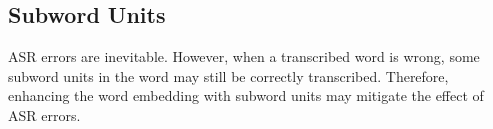 \documentclass[a4paper]{article}
\begin{document}
\begin{comment}
\begin{itemize}
  \item \textbf{BiDirectional Attention Flow (BiDAF)}~\cite{seo2016bidirectional}:   
  In BIDAF, both character-level and word-level embeddings are incorporated, and bi-directional attention flow  is introduced to obtain a query-aware context representation.
  
  \item \textbf{R-NET}~\cite{wang2017gated}: 
  In R-NET, the dependency in long context is captured more than plain recurrent neural network. A self-matching mechanism is introduced to dynamically refine context representation with information from the whole context.
  
  \item \textbf{Mnemonic Reader}~\cite{hu2017reinforced}:
  In Mnemonic Reader, the model iteratively align context with the query and the context itself, and the memory-based pointer allows the model to repeatedly refine its prediction answer boundary. In addition, they incorporate reinforcement learning to optimize F1 score.
   
  \item \textbf{FusionNet}~\cite{huang2017fusionnet}:
  In FusionNet, the model captures different levels of semantic information layer-by-layer and uses a fully-aware multi-level attention mechanism to capture the complete information in text.
  
  \item \textbf{Dr.QA}~\cite{chen2017reading}: 
  We use only the document reader from the paper in our experiments which is a multi-layer recurrent neural network. This model uses POS/NER tag and some heuristic features and have a rather simpler architecture comparing to the above models. \end{itemize}
\end{comment}







\subsection{Subword Units}
ASR errors are inevitable.
However, when a transcribed word is wrong, some subword units in the word may  still be correctly transcribed.
Therefore, enhancing the word embedding with subword units may mitigate the effect of ASR errors.
\end{document}
